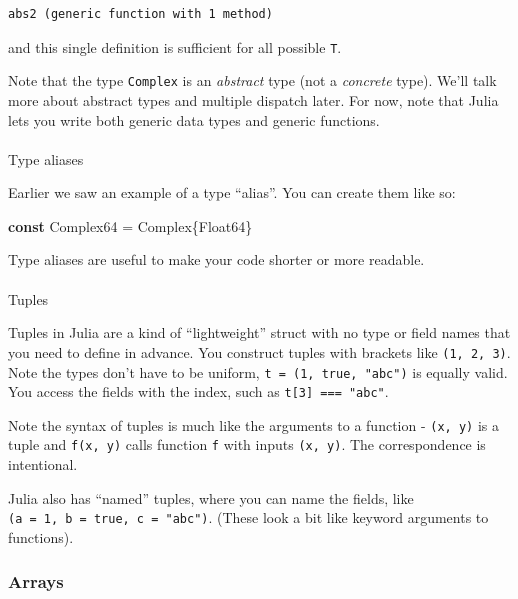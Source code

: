 \documentclass[
]{article}
\makeatletter
\let\oldparagraph\paragraph
\renewcommand{\paragraph}{
    \@ifstar
      \xxxParagraphStar
      \xxxParagraphNoStar
  }
\newcommand{\xxxParagraphStar}[1]{\oldparagraph*{#1}\mbox{}}
\newcommand{\xxxParagraphNoStar}[1]{\oldparagraph{#1}\mbox{}}
\newenvironment{Shaded}{\begin{snugshade}}{\end{snugshade}}
\newcommand{\DataTypeTok}[1]{\textcolor[rgb]{0.68,0.00,0.00}{#1}}
\newcommand{\KeywordTok}[1]{\textcolor[rgb]{0.00,0.23,0.31}{\textbf{#1}}}
\newcommand{\NormalTok}[1]{\textcolor[rgb]{0.00,0.23,0.31}{#1}}
\newcommand{\OperatorTok}[1]{\textcolor[rgb]{0.37,0.37,0.37}{#1}}
\makeatother
\begin{document}
\begin{verbatim}
abs2 (generic function with 1 method)
\end{verbatim}

and this single definition is sufficient for all possible \texttt{T}.

Note that the type \texttt{Complex} is an \emph{abstract} type (not a
\emph{concrete} type). We'll talk more about abstract types and multiple
dispatch later. For now, note that Julia lets you write both generic
data types and generic functions.

\paragraph{Type aliases}\label{type-aliases}

Earlier we saw an example of a type ``alias''. You can create them like
so:

\begin{Shaded}
\begin{Highlighting}[]
\KeywordTok{const} \DataTypeTok{Complex64} \OperatorTok{=} \DataTypeTok{Complex}\NormalTok{\{}\DataTypeTok{Float64}\NormalTok{\}}
\end{Highlighting}
\end{Shaded}

Type aliases are useful to make your code shorter or more readable.

\paragraph{Tuples}\label{tuples}

Tuples in Julia are a kind of ``lightweight'' struct with no type or
field names that you need to define in advance. You construct tuples
with brackets like \texttt{(1,\ 2,\ 3)}. Note the types don't have to be
uniform, \texttt{t\ =\ (1,\ true,\ "abc")} is equally valid. You access
the fields with the index, such as \texttt{t{[}3{]}\ ===\ "abc"}.

Note the syntax of tuples is much like the arguments to a function -
\texttt{(x,\ y)} is a tuple and \texttt{f(x,\ y)} calls function
\texttt{f} with inputs \texttt{(x,\ y)}. The correspondence is
intentional.

Julia also has ``named'' tuples, where you can name the fields, like
\texttt{(a\ =\ 1,\ b\ =\ true,\ c\ =\ "abc")}. (These look a bit like
keyword arguments to functions).

\subsubsection{Arrays}\label{arrays}
\end{document}
